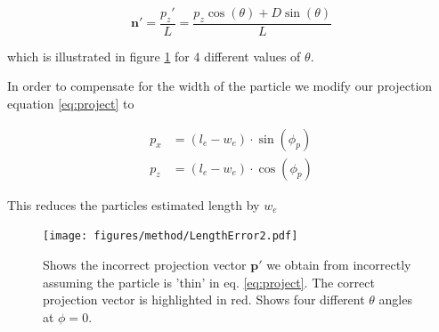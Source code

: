 \begin{equation}\label{eq:widthcomp}
\mathbf{n}' = \frac{p_z'}{L} = \frac{p_z\cos(\theta)  + D\sin(\theta)}{L} 
\end{equation}

which is illustrated in figure \ref{fig:lengtherror} for 4 different values of $\theta$. 

In order to compensate for the width of the particle we modify our projection equation \ref{eq:project} to

\begin{align}\label{eq:widthCompensation}
p_x  &= (l_e - w_e)\cdot \sin(\phi_p) \\
p_z  &= (l_e - w_e)\cdot \cos(\phi_p) 
\end{align}


This reduces the particles estimated length by $w_e$
\begin{figure}[H]
\centering
\texttt{[image: figures/method/LengthError2.pdf]}
\caption{Shows the incorrect projection vector $\mathbf{p}'$ we obtain from incorrectly assuming the particle is 'thin' in eq. \ref{eq:project}. The correct projection vector is highlighted in red. Shows four different $\theta$ angles at $\phi=0$.}\label{fig:lengtherror}
\end{figure} 

